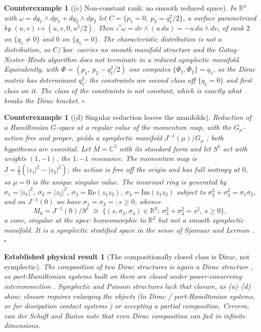 \documentclass[12pt,a4paper]{article}
\theoremstyle{definition}
\theoremstyle{plain}
\theoremstyle{commentary}
\newtheorem{established}[definition]{Established physical result}
\newtheorem{counterexample}[definition]{Counterexample}
\newcommand{\R}{\mathbb{R}}
\newcommand{\Cbb}{\mathbb{C}}
\begin{document}
\begin{counterexample}[(c) Non-constant rank: no smooth reduced space]\label{cex:rank}
In $\R^{4}$ with $\omega=dq_1\wedge dp_1+dq_2\wedge dp_2$ let $C=\{p_1=0,\ p_2=q_1^{2}/2\}$, a
surface parametrized by $(u,v)\mapsto(u,v,0,u^{2}/2)$. Then
$\iota^{*}\omega=dv\wedge(u\,du)=-u\,du\wedge dv$, of rank $2$ on $\{q_1\ne0\}$ and $0$ on
$\{q_1=0\}$. The characteristic distribution is not a distribution, so $C/\ker$ carries no
smooth manifold structure and the Gotay--Nester--Hinds algorithm \cite{GotayNesterHinds1978}
does not terminate in a reduced symplectic manifold. Equivalently, with
$\Phi=(p_1,\ p_2-q_1^{2}/2)$ one computes $\{\Phi_1,\Phi_2\}=q_1$, so the Dirac matrix has
determinant $q_1^{2}$: the constraints are second class off $\{q_1=0\}$ and first class on it.
The \emph{class} of the constraints is not constant, which is exactly what breaks the Dirac
bracket. \hfill$\square$
\end{counterexample}

\begin{counterexample}[(d) Singular reduction leaves the manifolds]\label{cex:singular}
Reduction of a Hamiltonian $G$-space at a regular value of the momentum map, with the
$G_\mu$-action free and proper, yields a symplectic manifold $J^{-1}(\mu)/G_\mu$
\cite{MarsdenWeinstein1974,Meyer1973}; both hypotheses are essential. Let $M=\Cbb^{2}$ with its
standard form and let $S^{1}$ act with weights $(1,-1)$, the $1{:}{-1}$ resonance. The
momentum map is $J=\tfrac12(|z_1|^{2}-|z_2|^{2})$; the action is free off the origin and has
full isotropy at $0$, so $\mu=0$ is the unique singular value. The invariant ring is generated
by
$\sigma_1=|z_1|^{2}$, $\sigma_2=|z_2|^{2}$, $\sigma_3=\mathrm{Re}(z_1z_2)$,
$\sigma_4=\mathrm{Im}(z_1z_2)$ subject to $\sigma_3^{2}+\sigma_4^{2}=\sigma_1\sigma_2$, and on
$J^{-1}(0)$ we have $\sigma_1=\sigma_2=:s\ge0$, whence
\[
 M_0=J^{-1}(0)/S^{1}\;\cong\;\{(s,\sigma_3,\sigma_4)\in\R^{3}:\
 \sigma_3^{2}+\sigma_4^{2}=s^{2},\ s\ge0\},
\]
a cone, singular at the apex: homeomorphic to $\R^{2}$ but not a smooth symplectic manifold.
It is a symplectic \emph{stratified} space in the sense of Sjamaar and Lerman
\cite{SjamaarLerman1991}. \hfill$\square$
\end{counterexample}

\begin{established}[The compositionally closed class is Dirac, not symplectic]
\label{estab:dirac}
The composition of two Dirac structures is again a Dirac structure
\cite{Courant1990,Cerveraetal2007}, so port-Hamiltonian systems built on them are closed under
power-conserving interconnection \cite{vanderSchaftJeltsema2014}. Symplectic and Poisson
structures lack that closure, as (a)--(d) show; closure requires enlarging the objects (to
Dirac / port-Hamiltonian systems, or for dissipation contact systems
\cite{Bravettietal2017}) or accepting a partial composition. Cervera, van der Schaft and
Ba\~nos note that even Dirac composition can fail in infinite dimensions.
\end{established}
\end{document}
